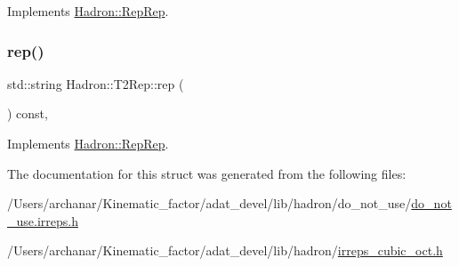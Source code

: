 Implements \mbox{\hyperlink{structHadron_1_1RepRep_ab3213025f6de249f7095892109575fde}{Hadron\+::\+Rep\+Rep}}.

\mbox{\label{structHadron_1_1T2Rep_aa8debf402fc347d71fe8ba6745578c0d}} 
\subsubsection{\texorpdfstring{rep()}{rep()}\hspace{0.1cm}{\footnotesize\ttfamily [3/3]}}
{\footnotesize\ttfamily std\+::string Hadron\+::\+T2\+Rep\+::rep (\begin{DoxyParamCaption}{ }\end{DoxyParamCaption}) const\hspace{0.3cm}{\ttfamily [inline]}, {\ttfamily [virtual]}}



Implements \mbox{\hyperlink{structHadron_1_1RepRep_ab3213025f6de249f7095892109575fde}{Hadron\+::\+Rep\+Rep}}.



The documentation for this struct was generated from the following files\+:\begin{DoxyCompactItemize}
\item 
/\+Users/archanar/\+Kinematic\+\_\+factor/adat\+\_\+devel/lib/hadron/do\+\_\+not\+\_\+use/\mbox{\hyperlink{do__not__use_8irreps_8h}{do\+\_\+not\+\_\+use.\+irreps.\+h}}\item 
/\+Users/archanar/\+Kinematic\+\_\+factor/adat\+\_\+devel/lib/hadron/\mbox{\hyperlink{lib_2hadron_2irreps__cubic__oct_8h}{irreps\+\_\+cubic\+\_\+oct.\+h}}\end{DoxyCompactItemize}
